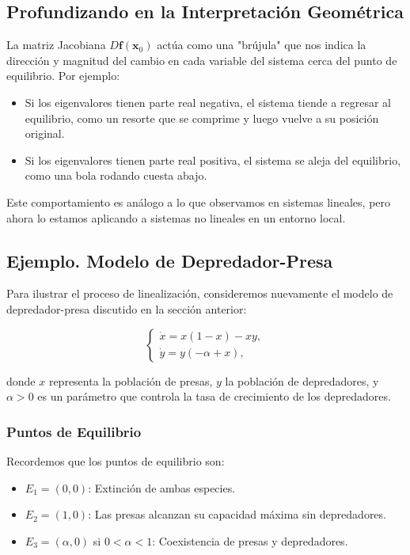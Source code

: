 \subsection{Profundizando en la Interpretación Geométrica}

La matriz Jacobiana $D\mathbf{f}(\mathbf{x}_0)$ actúa como una "brújula" que nos indica la dirección y magnitud del cambio en cada variable del sistema cerca del punto de equilibrio. Por ejemplo:
\begin{itemize} 
    \item Si los eigenvalores tienen parte real negativa, el sistema tiende a regresar al equilibrio, como un resorte que se comprime y luego vuelve a su posición original.
    \item Si los eigenvalores tienen parte real positiva, el sistema se aleja del equilibrio, como una bola rodando cuesta abajo.
\end{itemize}

Este comportamiento es análogo a lo que observamos en sistemas lineales, pero ahora lo estamos aplicando a sistemas no lineales en un entorno local.

\subsection{Ejemplo. Modelo de Depredador-Presa}

Para ilustrar el proceso de linealización, consideremos nuevamente el modelo de depredador-presa discutido en la sección anterior:

\begin{equation}\label{eq:ejemplo_sistema}
    \begin{cases}
        \dot{x} = x (1 - x) - xy, \\
        \dot{y} = y (-\alpha + x),
    \end{cases}
\end{equation}

donde $x$ representa la población de presas, $y$ la población de depredadores, y $\alpha > 0$ es un parámetro que controla la tasa de crecimiento de los depredadores.

\subsubsection{Puntos de Equilibrio}

Recordemos que los puntos de equilibrio son:
\begin{itemize}
    \item $E_1 = (0, 0)$: Extinción de ambas especies.
    \item $E_2 = (1, 0)$: Las presas alcanzan su capacidad máxima sin depredadores.
    \item $E_3 = (\alpha, 0)$ si $0 < \alpha < 1$: Coexistencia de presas y depredadores.
\end{itemize}


